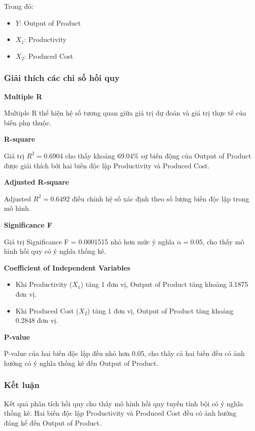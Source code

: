 Trong đó:

\begin{itemize}
\item $Y$: Output of Product
\item $X_1$: Productivity
\item $X_2$: Produced Cost
\end{itemize}

\subsubsection*{Giải thích các chỉ số hồi quy}

\textbf{Multiple R}

Multiple R thể hiện hệ số tương quan giữa giá trị dự đoán và
giá trị thực tế của biến phụ thuộc.

\textbf{R-square}

Giá trị $R^2 = 0.6904$ cho thấy khoảng 69.04\% sự biến động
của Output of Product được giải thích bởi hai biến độc lập
Productivity và Produced Cost.

\textbf{Adjusted R-square}

Adjusted $R^2 = 0.6492$ điều chỉnh hệ số xác định theo số lượng
biến độc lập trong mô hình.

\textbf{Significance F}

Giá trị Significance F = 0.0001515 nhỏ hơn mức ý nghĩa
$\alpha = 0.05$, cho thấy mô hình hồi quy có ý nghĩa thống kê.

\textbf{Coefficient of Independent Variables}

\begin{itemize}
\item Khi Productivity ($X_1$) tăng 1 đơn vị, Output of Product
tăng khoảng 3.1875 đơn vị.
\item Khi Produced Cost ($X_2$) tăng 1 đơn vị, Output of Product
tăng khoảng 0.2848 đơn vị.
\end{itemize}

\textbf{P-value}

P-value của hai biến độc lập đều nhỏ hơn 0.05,
cho thấy cả hai biến đều có ảnh hưởng có ý nghĩa
thống kê đến Output of Product.

\subsubsection*{Kết luận}

Kết quả phân tích hồi quy cho thấy mô hình hồi quy tuyến tính
bội có ý nghĩa thống kê. Hai biến độc lập Productivity và
Produced Cost đều có ảnh hưởng đáng kể đến Output of Product.



